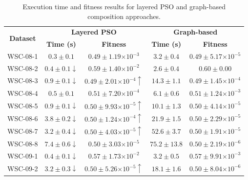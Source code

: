 \documentclass{llncs}
\providecommand{\e}[1]{\ensuremath{\times 10^{#1}}}
\begin{document}
\begin{table}[h]
\centering
\caption{Execution time and fitness results for layered PSO and graph-based composition approaches.}
\label{tab:results}
\begin{tabular}{|c|c|c|c|c|}
\hline
\multirow{2}{*}{{\bf Dataset}} & \multicolumn{2}{c|}{{\bf Layered PSO}}             & \multicolumn{2}{c|}{{\bf Graph-based}}                     \\ \cline{2-5} 
                               & {\bf Time (s)}    & {\bf Fitness}                  & {\bf Time (s)}            & {\bf Fitness}                  \\ \hline
WSC-08-1                       & $0.3 \pm 0.1$            & $0.49 \pm 1.19\e{-3}$          & $3.2 \pm 0.4$             & $0.49 \pm 5.17\e{-5}$          \\ \hline
WSC-08-2                       & $0.4 \pm 0.1 \downarrow$ & $0.59 \pm 1.40\e{-2}$          & $2.6 \pm 0.4$             & $0.60 \pm 0.00$                \\ \hline
WSC-08-3                       & $0.9 \pm 0.1 \downarrow$ & $0.49 \pm 2.01\e{-4} \uparrow$ & $14.3 \pm 1.1$            & $0.49 \pm 1.45\e{-4}$          \\ \hline
WSC-08-4                       & $0.5 \pm 0.1$            & $0.51 \pm 7.20\e{-4}$          & $6.1 \pm 0.6$             & $0.51 \pm 1.24\e{-3}$          \\ \hline
WSC-08-5                       & $0.9 \pm 0.1 \downarrow$ & $0.50 \pm 9.93\e{-5} \uparrow$ & $10.1 \pm 1.3$            & $0.50 \pm 4.14\e{-5}$          \\ \hline
WSC-08-6                       & $3.8 \pm 0.2 \downarrow$ & $0.50 \pm 1.24\e{-4} \uparrow$ & $21.9 \pm 1.5$            & $0.50 \pm 2.29\e{-5}$          \\ \hline
WSC-08-7                       & $3.2 \pm 0.4 \downarrow$ & $0.50 \pm 4.03\e{-5} \uparrow$ & $52.6 \pm 3.7$            & $0.50 \pm 1.91\e{-5}$          \\ \hline
WSC-08-8                       & $7.4 \pm 0.6 \downarrow$ & $0.50 \pm 3.03\e{-5}$          & $75.2 \pm 13.8$           & $0.50 \pm 2.19\e{-6}$          \\ \hline
WSC-09-1                       & $0.4 \pm 0.1 \downarrow$ & $0.57 \pm 1.73\e{-2}$          & $3.2 \pm 0.5$             & $0.57 \pm 9.91\e{-3}$          \\ \hline
WSC-09-2                       & $3.2 \pm 0.3 \downarrow$ & $0.50 \pm 5.26\e{-5} \uparrow$ & $18.1 \pm 1.6$            & $0.50 \pm 8.04\e{-6}$          \\ \hline

\end{tabular}
\end{table}
\end{document}
